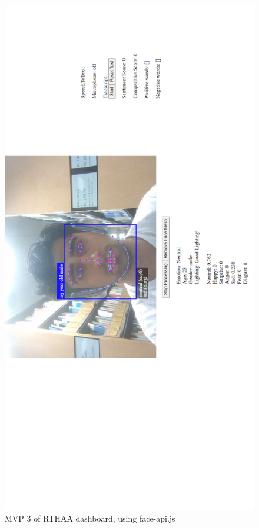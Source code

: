 \documentclass[12pt, a4paper]{article}
\begin{document}
\begin{appendices}
\begin{figure}[H]
    \centering
    \includegraphics[scale=0.58]{images/webappFE3.png}
    \caption{MVP 3 of RTHAA dashboard, using face-api.js}
    \label{fig:wa4}
\end{figure}


\end{appendices}
\end{document}
